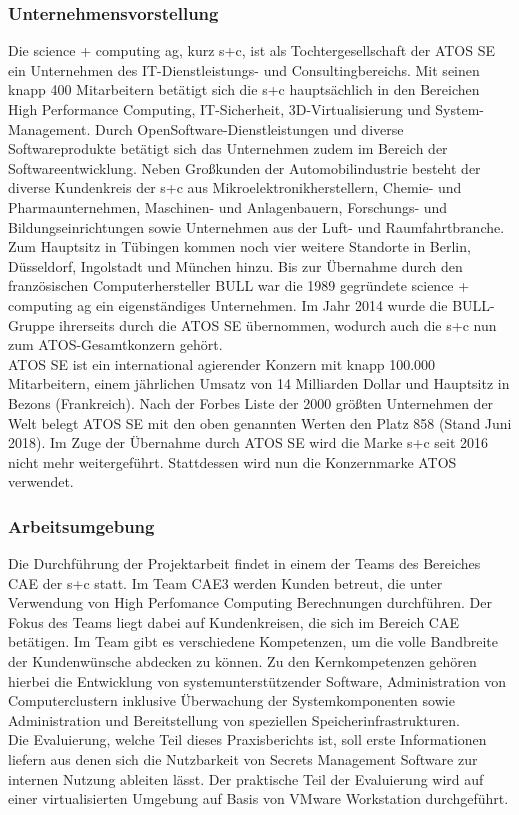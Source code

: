 \documentclass[
book,
a4paper,   
titlepage,  
halfparskip,
12pt        
]{scrartcl}
\begin{document}
\begin{onehalfspacing}
\subsubsection{Unternehmensvorstellung}
Die science + computing ag, kurz s+c, ist als Tochtergesellschaft der ATOS SE ein Unternehmen des \ac{IT}-Dienstleistungs- und Consultingbereichs. Mit seinen knapp 400 Mitarbeitern betätigt sich die s+c hauptsächlich in den Bereichen High Performance Computing, \ac{IT}-Sicherheit, 3D-Virtualisierung und System-Management. Durch OpenSoftware-Dienstleistungen und diverse Softwareprodukte betätigt sich das Unternehmen zudem im Bereich der Softwareentwicklung. Neben Großkunden der Automobilindustrie besteht der diverse Kundenkreis der s+c aus Mikroelektronikherstellern, Chemie- und Pharmaunternehmen, Maschinen- und Anlagenbauern, Forschungs- und Bildungseinrichtungen sowie Unternehmen aus der Luft- und Raumfahrtbranche.\\
Zum Hauptsitz in Tübingen kommen noch vier weitere Standorte in Berlin, Düsseldorf, Ingolstadt und München hinzu. Bis zur Übernahme durch den französischen Computerhersteller BULL war die 1989 gegründete science + computing ag ein eigenständiges Unternehmen.\cite{bull} Im Jahr 2014 wurde die BULL-Gruppe ihrerseits durch die ATOS SE übernommen, wodurch auch die s+c nun zum ATOS-Gesamtkonzern gehört.\cite{atos}\\
ATOS SE ist ein international agierender Konzern mit knapp 100.000 Mitarbeitern, einem jährlichen Umsatz von 14 Milliarden Dollar und Hauptsitz in Bezons (Frankreich). Nach der Forbes Liste der 2000 größten Unternehmen der Welt belegt ATOS SE mit den oben genannten Werten den Platz 858 (Stand Juni 2018).\cite{forbes} Im Zuge der Übernahme durch ATOS SE wird die Marke s+c seit 2016 nicht mehr weitergeführt. Stattdessen wird nun die Konzernmarke ATOS verwendet.

\subsubsection{Arbeitsumgebung}
Die Durchführung der Projektarbeit findet in einem der Teams des Bereiches \ac{CAE} der s+c statt. Im Team \ac{CAE}3 werden Kunden betreut, die unter Verwendung von High Perfomance Computing Berechnungen durchführen. Der Fokus des Teams liegt dabei auf Kundenkreisen, die sich im Bereich \ac{CAE} betätigen. Im Team gibt es verschiedene Kompetenzen, um die volle Bandbreite der Kundenwünsche abdecken zu können. Zu den Kernkompetenzen gehören hierbei die Entwicklung von systemunterstützender Software, Administration von Computerclustern inklusive Überwachung der Systemkomponenten sowie Administration und Bereitstellung von speziellen Speicherinfrastrukturen.\\
Die Evaluierung, welche Teil dieses Praxisberichts ist, soll erste Informationen liefern aus denen sich die Nutzbarkeit von Secrets Management Software zur internen Nutzung ableiten lässt. Der praktische Teil der Evaluierung wird auf einer virtualisierten Umgebung auf Basis von VMware Workstation durchgeführt.


\end{onehalfspacing}
\end{document}
